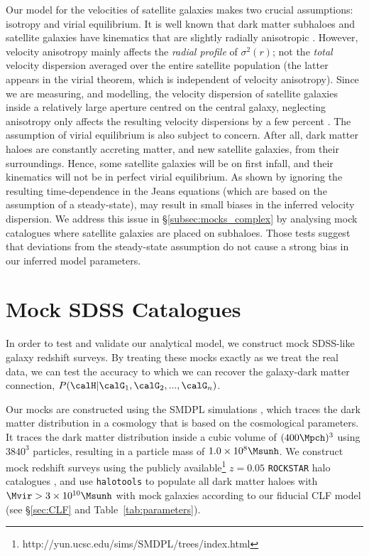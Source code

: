 \documentclass[fleqn,usenatbib,useAMS]{mnras}
\begin{document}
	Our model for the velocities of satellite galaxies makes two crucial assumptions:
	isotropy and virial equilibrium. It is well known that dark matter subhaloes and satellite galaxies have kinematics that are slightly radially anisotropic \citep[e.g.,][]{Diemand+04, Wojtak+13}.
	However, velocity anisotropy mainly affects the {\it radial profile} of $\sigma^2(r)$; not the {\it total} velocity dispersion averaged over the entire satellite population (the latter appears in the virial theorem, which is independent of velocity anisotropy). Since we are measuring, and modelling, the velocity dispersion of satellite galaxies inside a relatively large aperture centred on the central galaxy, neglecting anisotropy only affects the resulting velocity dispersions by a few percent \citep[see][for details]{vdBosch+04, Mamon.Lokas.05, Conroy+07}. The assumption of virial equilibrium is also subject to concern. After all,  dark matter haloes are constantly accreting matter, and new satellite galaxies, from their surroundings. Hence, some satellite galaxies will be on first infall, and their kinematics will not be in perfect virial equilibrium. As shown by \citet{Ye+17} ignoring the resulting time-dependence in the Jeans equations (which are based on the assumption of a steady-state), may result in small biases in the  inferred velocity dispersion. We address this issue in \S\ref{subsec:mocks_complex} by analysing mock catalogues where satellite galaxies are placed on subhaloes. Those tests suggest that deviations from the steady-state assumption do not cause a strong bias in our inferred model parameters.
	
	\section{Mock SDSS Catalogues}
	\label{sec:mocks}
	
	In order to test and validate our analytical model, we construct mock SDSS-like galaxy redshift surveys. By treating these mocks exactly as we treat the real data, we can test the accuracy to which we can recover the galaxy-dark matter connection, $P(\calH | \calG_1, \calG_2,...,\calG_n)$. 
	
	Our mocks are constructed using the SMDPL simulations \citep{Klypin+16}, which traces the dark matter distribution in a cosmology that is based on the \cite{Planck14} cosmological parameters. It traces the dark matter distribution inside a cubic volume of $(400 \Mpch)^3$ using $3840^3$ particles, resulting in a particle mass of $1.0 \times 10^8 \Msunh$. We construct mock redshift surveys using the publicly available\footnote{http://yun.ucsc.edu/sims/SMDPL/trees/index.html} $z = 0.05$ \texttt{ROCKSTAR} halo catalogues \citep{Behroozi+13}, and use \texttt{halotools} \citep{Hearin+16} to populate all dark matter haloes with $\Mvir > 3 \times 10^{10} \Msunh$ with mock galaxies according to our fiducial CLF model (see \S\ref{sec:CLF} and Table~\ref{tab:parameters}).
	
\end{document}
